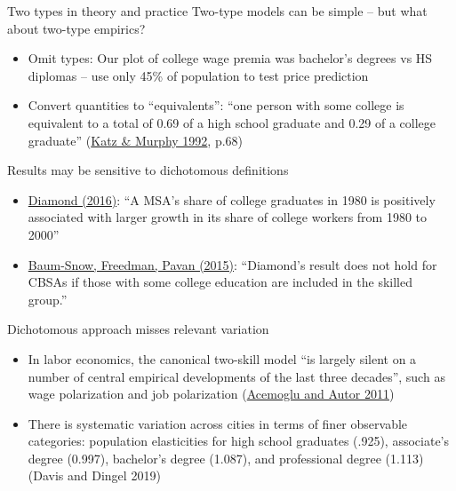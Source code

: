 \documentclass[10pt,notes=hide]{beamer}
\begin{document}
\begin{frame}{Two types in theory and practice}
Two-type models can be simple -- but what about two-type empirics?
\begin{itemize}
	\item Omit types: Our plot of college wage premia was bachelor's degrees vs HS diplomas -- use only 45\% of population to test price prediction
	\item Convert quantities to ``equivalents'': ``one person with some college is equivalent to a total of 0.69 of a high school graduate and 0.29 of a college graduate'' (\href{http://www.jstor.org/stable/2118323}{Katz \& Murphy 1992}, p.68)
\end{itemize}
\pause Results may be sensitive to dichotomous definitions
\begin{itemize}
	\item \href{https://www.aeaweb.org/articles?id=10.1257/aer.20131706}{Diamond (2016)}: ``A MSA's share of college graduates in 1980 is positively associated with larger growth in its share of college workers from 1980 to 2000''
	\item \href{http://www.econ.brown.edu/fac/nathaniel_baum-snow/capital_all_oct2014.pdf}{Baum-Snow, Freedman, Pavan (2015)}: ``Diamond's result does not hold for CBSAs if those with some college education are included in the skilled group.''
\end{itemize}
\end{frame}
\begin{frame}{Dichotomous approach misses relevant variation}
\begin{itemize}
	\item In labor economics, the canonical two-skill model ``is largely silent on a number of central empirical developments of the last three decades'', such as wage polarization and job polarization (\href{http://www.sciencedirect.com/science/article/pii/S0169721811024105}{Acemoglu and Autor 2011})
	\item There is systematic variation across cities in terms of finer observable categories: population elasticities for high school graduates (.925), associate's degree (0.997), bachelor's degree (1.087), and professional degree (1.113) (Davis and Dingel 2019)
\end{itemize}
\end{frame}
\end{document}
